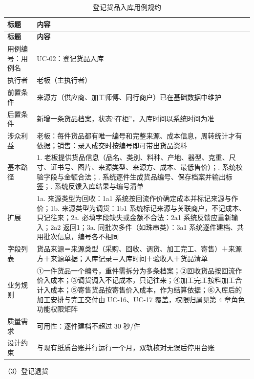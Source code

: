 {\small
\begin{longtable}{@{}L{3.0cm} L{12.3cm}@{}}
\caption{登记货品入库用例规约}\label{tab:uc-02}\\
\toprule
\textbf{标题} & \textbf{内容} \\
\midrule
\endfirsthead
\toprule
\textbf{标题} & \textbf{内容} \\
\midrule
\endhead
用例编号：用例名 & UC-02：登记货品入库 \\
\midrule
执行者 & 老板（主执行者） \\
\midrule
前置条件 & 来源方（供应商、加工师傅、同行商户）已在基础数据中维护 \\
\midrule
后置条件 & 新增一条货品档案，状态“在柜”，入库时间以系统时间为准 \\
\midrule
涉众利益 & 老板：每件货品都有唯一编号和完整来源、成本信息，周转统计才有依据；\newline 销售：录入成交时按编号即可带出货品资料 \\
\midrule
基本路径 & 1. 老板提供货品信息（品名、类别、料种、产地、器型、克重、尺寸、证书号、图片、来源类型、来源方、成本、最低售价）；. 系统校验字段与金额合法；. 系统逐件生成货品编号、保存档案并输出标签；. 系统反馈入库结果与编号清单 \\
\midrule
扩展 & 1a. 来源类型为回收：1a1 系统按回流作价确定成本并标记来源与作价；\newline 1b. 来源类型为调货：1b1 系统标记来源与关联商户，不记成本、只记往来；\newline 2a. 必填字段缺失或金额不合法：2a1 系统反馈应重新输入；2a2 返回1；\newline 3a. 同批次多件（如珠串类）：3a1 系统逐件建档、共用批次信息，编号各不相同 \\
\midrule
字段列表 & 货品来源＝来源类型（采购、回收、调货、加工完工、寄售）＋来源方＋来源单据；\newline 入库记录＝入库时间＋验收人＋货品清单 \\
\midrule
业务规则 & ①一件货品一个编号，重件需拆分为多条档案；\newline ②回收货品按回流作价入成本；\newline ③调货调入不记成本，只记往来；\newline ④加工完工按料加工合计入成本；\newline ⑤寄售货品按寄售价入成本，作为结算依据；\newline ⑥入库后的加工安排与完工交付由 UC-16、UC-17 覆盖，权限归属见第 4 章角色功能权限矩阵 \\
\midrule
质量需求 & 可用性：逐件建档不超过 30 秒/件 \\
\midrule
设计约束 & 与现有纸质台账并行运行一个月，双轨核对无误后停用台账 \\
\midrule
\bottomrule
\end{longtable}}
\noindent（3）登记退货

